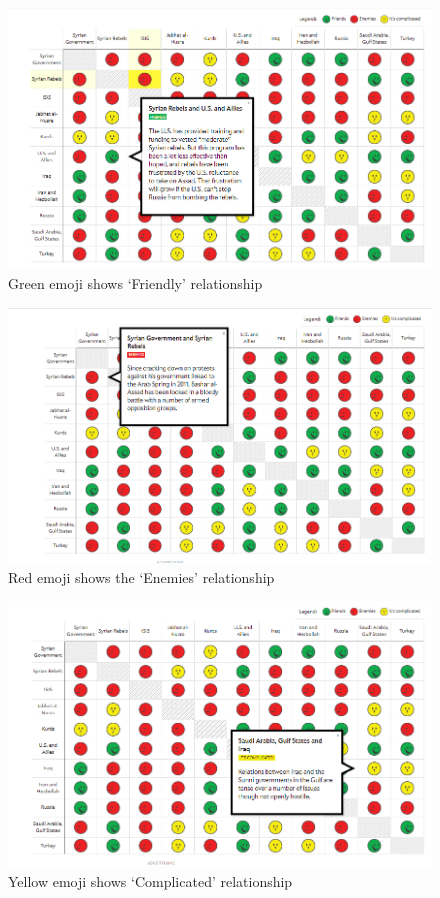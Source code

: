 \documentclass[]{book}
\theoremstyle{definition}
\theoremstyle{definition}
\theoremstyle{definition}
\theoremstyle{remark}
\begin{document}
\begin{figure}
\centering
\includegraphics{images/img_syria_friendly.PNG}
\caption{Green emoji shows `Friendly' relationship}
\end{figure}

\begin{figure}
\centering
\includegraphics{images/img_syria_enemies.PNG}
\caption{Red emoji shows the `Enemies' relationship}
\end{figure}

\begin{figure}
\centering
\includegraphics{images/img_syria_complicated.PNG}
\caption{Yellow emoji shows `Complicated' relationship}
\end{figure}
\end{document}
